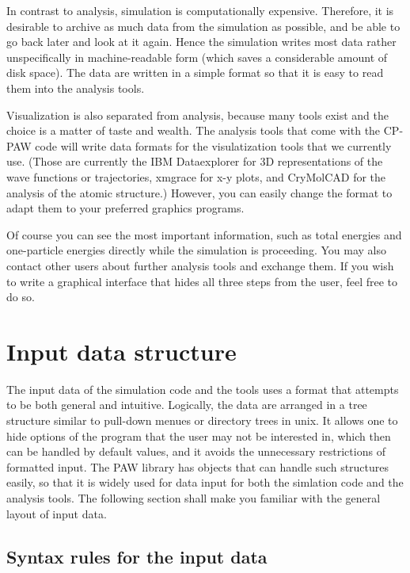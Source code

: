 \documentclass[final,12pt]{article}
\begin{document}
In contrast to analysis, simulation is computationally expensive.
Therefore, it is desirable to archive as much data from the simulation
as possible, and be able to go back later and look at it again. Hence
the simulation writes most data rather unspecifically in
machine-readable form (which saves a considerable amount of disk
space).  The data are written in a simple format so that it is easy to
read them into the analysis tools.

Visualization is also separated from analysis, because many tools
exist and the choice is a matter of taste and wealth. The analysis
tools that come with the CP-PAW code will write data formats for the
visulatization tools that we currently use. (Those are currently the
IBM Dataexplorer \cite{opendx} for 3D representations of the
wave functions or trajectories, xmgrace \cite{xmgrace} for x-y plots, and
CryMolCAD\cite{crymolcad} for the analysis of the atomic structure.)
However, you can easily change the format to adapt them to your
preferred graphics programs.

Of course you can see the most important information, such as total
energies and one-particle energies directly while the simulation is
proceeding. You may also contact other users about further analysis
tools and exchange them. If you wish to write a graphical interface
that hides all three steps from the user, feel free to do so.


\section{Input data structure}
%
The input data of the simulation code and the tools uses a format
that attempts to be both general and intuitive. Logically, the data
are arranged in a tree structure similar to pull-down menues or
directory trees in unix. It allows one to hide options of the program that
the user may not be interested in, which then can be handled by
default values, and it avoids the unnecessary restrictions of formatted
input. The PAW library has objects that can handle such structures
easily, so that it is widely used for data input for both the
simlation code and the analysis tools. The following section shall
make you familiar with the general layout of input data.
%
\subsection{Syntax rules for the input data}
\end{document}
